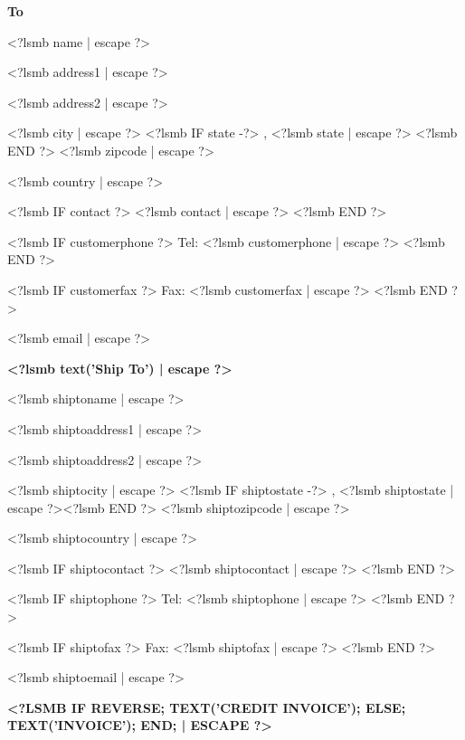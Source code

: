 \documentclass{scrartcl}
\begin{document}
\parbox[t]{.5\textwidth}{
\textbf{To}
\vspace{0.3cm}

<?lsmb name | escape ?>

<?lsmb address1 | escape ?>

<?lsmb address2 | escape ?>

<?lsmb city | escape ?>
<?lsmb IF state -?>
\hspace{-0.1cm}, <?lsmb state | escape ?> <?lsmb END ?> <?lsmb zipcode | escape ?>

<?lsmb country | escape ?>

\vspace{0.3cm}

<?lsmb IF contact ?>
<?lsmb contact | escape ?>
\vspace{0.2cm}
<?lsmb END ?>

<?lsmb IF customerphone ?>
Tel: <?lsmb customerphone | escape ?>
<?lsmb END ?>

<?lsmb IF customerfax ?>
Fax: <?lsmb customerfax | escape ?>
<?lsmb END ?>

<?lsmb email | escape ?>
}
\parbox[t]{.5\textwidth}{
\textbf{<?lsmb text('Ship To') | escape ?>}
\vspace{0.3cm}

<?lsmb shiptoname | escape ?>

<?lsmb shiptoaddress1 | escape ?>

<?lsmb shiptoaddress2 | escape ?>

<?lsmb shiptocity | escape ?>
<?lsmb IF shiptostate -?>
\hspace{-0.1cm}, <?lsmb shiptostate | escape ?><?lsmb END ?> <?lsmb shiptozipcode | escape ?>

<?lsmb shiptocountry | escape ?>

\vspace{0.3cm}

<?lsmb IF shiptocontact ?>
<?lsmb shiptocontact | escape ?>
\vspace{0.2cm}
<?lsmb END ?>

<?lsmb IF shiptophone ?>
Tel: <?lsmb shiptophone | escape ?>
<?lsmb END ?>

<?lsmb IF shiptofax ?>
Fax: <?lsmb shiptofax | escape ?>
<?lsmb END ?>

<?lsmb shiptoemail | escape ?>
}
\hfill

\vspace{1cm}

\textbf{\MakeUppercase{<?lsmb
    IF reverse;
       text('Credit Invoice');
    ELSE;
       text('Invoice');
    END; | escape ?>}}
\hfill
\end{document}
